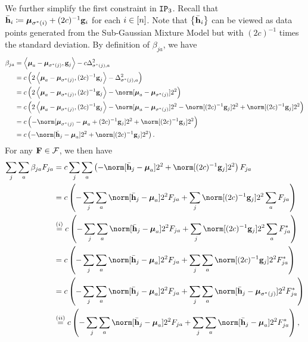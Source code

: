 We further simplify the first constraint in $\textup{\texttt{IP}}_{3}$. Recall that
$\bar{\mathbf{h}}_{i}\coloneqq\boldsymbol{\mu}_{\sigma^{*}(i)}+(2c)^{-1}\mathbf{g}_{i}$ for
each $i\in[n]$. Note that $\left\{ \bar{\mathbf{h}}_{i}\right\} $ can
be viewed as data points generated from the Sub-Gaussian Mixture Model
but with $(2c)^{-1}$ times the standard deviation. By definition
of $\beta_{ja}$, we have 
\begin{align*}
\beta_{ja} & =\left\langle \Mean_{a}-\Mean_{\labelstar(j)},\g_{j}\right\rangle -c\minsep_{\labelstar(j),a}^{2}\\
 & =c\left(2\left\langle \Mean_{a}-\Mean_{\labelstar(j)},(2c)^{-1}\g_{j}\right\rangle -\minsep_{\labelstar(j),a}^{2}\right)\\
 & =c\left(2\left\langle \Mean_{a}-\Mean_{\labelstar(j)},(2c)^{-1}\g_{j}\right\rangle -\norm[\Mean_{a}-\Mean_{\labelstar(j)}]2^{2}\right)\\
 & =c\left(2\left\langle \Mean_{a}-\Mean_{\labelstar(j)},(2c)^{-1}\g_{j}\right\rangle -\norm[\Mean_{a}-\Mean_{\labelstar(j)}]2^{2}-\norm[(2c)^{-1}\g_{j}]2^{2}+\norm[(2c)^{-1}\g_{j}]2^{2}\right)\\
 & =c\left(-\norm[\Mean_{\labelstar(j)}-\Mean_{a}+(2c)^{-1}\g_{j}]2^{2}+\norm[(2c)^{-1}\g_{j}]2^{2}\right)\\
 & =c\left(-\norm[\bar{\h}_{j}-\Mean_{a}]2^{2}+\norm[(2c)^{-1}\g_{j}]2^{2}\right).
\end{align*}
For any $\mathbf{F}\in\mathcal{F}$, we then have
\begin{align*}
\sum_{j}\sum_{a}\beta_{ja}F_{ja} & =c\sum_{j}\sum_{a}\left(-\norm[\bar{\h}_{j}-\Mean_{a}]2^{2}+\norm[(2c)^{-1}\g_{j}]2^{2}\right)F_{ja}\\
 & =c\left(-\sum_{j}\sum_{a}\norm[\bar{\h}_{j}-\Mean_{a}]2^{2}F_{ja}+\sum_{j}\norm[(2c)^{-1}\g_{j}]2^{2}\sum_{a}F_{ja}\right)\\
 & \overset{(i)}{=}c\left(-\sum_{j}\sum_{a}\norm[\bar{\h}_{j}-\Mean_{a}]2^{2}F_{ja}+\sum_{j}\norm[(2c)^{-1}\g_{j}]2^{2}\sum_{a}F_{ja}^{*}\right)\\
 & =c\left(-\sum_{j}\sum_{a}\norm[\bar{\h}_{j}-\Mean_{a}]2^{2}F_{ja}+\sum_{j}\sum_{a}\norm[(2c)^{-1}\g_{j}]2^{2}F_{ja}^{*}\right)\\
 & =c\left(-\sum_{j}\sum_{a}\norm[\bar{\h}_{j}-\Mean_{a}]2^{2}F_{ja}+\sum_{j}\sum_{a}\norm[\bar{\h}_{j}-\Mean_{\labelstar(j)}]2^{2}F_{ja}^{*}\right)\\
 & \overset{(ii)}{=}c\left(-\sum_{j}\sum_{a}\norm[\bar{\h}_{j}-\Mean_{a}]2^{2}F_{ja}+\sum_{j}\sum_{a}\norm[\bar{\h}_{j}-\Mean_{a}]2^{2}F_{ja}^{*}\right),
\end{align*}
